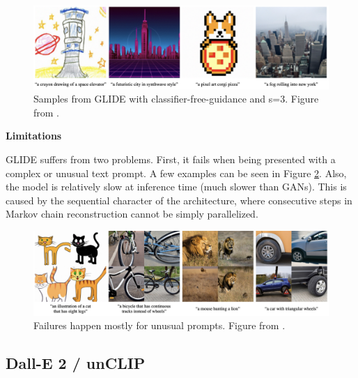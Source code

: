 \documentclass[
]{krantz}
\begin{document}
\begin{figure}

{\centering \includegraphics[width=1\linewidth]{figures/02-02-text-2-img/glideresults} 

}

\caption{Samples from GLIDE with classifier-free-guidance and s=3. Figure from \citet{Glide2021}.}\label{fig:glideresults}
\end{figure}



\textbf{Limitations}

GLIDE suffers from two problems. First, it fails when being presented with a complex or unusual text prompt. A few examples can be seen in Figure \ref{fig:glidefails}. Also, the model is relatively slow at inference time (much slower than GANs). This is caused by the sequential character of the architecture, where consecutive steps in Markov chain reconstruction cannot be simply parallelized.

\begin{figure}

{\centering \includegraphics[width=1\linewidth]{figures/02-02-text-2-img/glidefails} 

}

\caption{Failures happen mostly for unusual prompts. Figure from \citet{Glide2021}.}\label{fig:glidefails}
\end{figure}



\hypertarget{dall-e-2-unclip}{%
\subsection{Dall-E 2 / unCLIP}\label{dall-e-2-unclip}}
\end{document}
